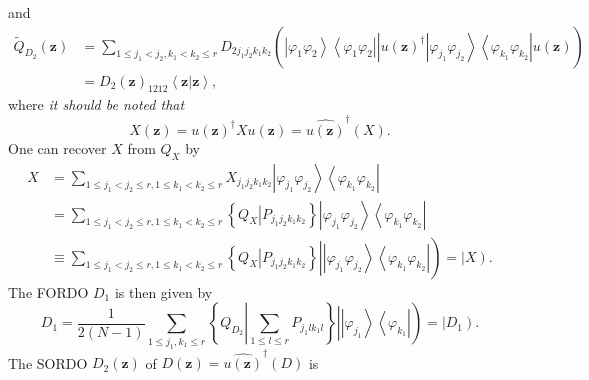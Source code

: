 \documentclass[aps,preprint]{revtex4}%
\begin{document}
and
\begin{align}
\tilde{Q}_{D_{2}}\left(  \mathbf{z}\right)   &  =\sum_{1\leq j_{1}<j_{2}%
,k_{1}<k_{2}\leq r}D_{2j_{1}j_{2}k_{1}k_{2}}\left(  \left.
\overset{}{\left\vert \varphi_{1}\varphi_{2}\right\rangle \left\langle
\varphi_{1}\varphi_{2}\right\vert }\right\vert \overset{}{u\left(
\mathbf{z}\right)  ^{\dagger}\left\vert \varphi_{j_{1}}\varphi_{j_{2}%
}\right\rangle \left\langle \varphi_{k_{1}}\varphi_{k_{2}}\right\vert u\left(
\mathbf{z}\right)  }\right)  \nonumber\\
&  =D_{2}\left(  \mathbf{z}\right)  _{1212}\left\langle \mathbf{z}\left\vert
\mathbf{z}\right.  \right\rangle ,
\end{align}
where \emph{it should be noted that }
\begin{equation}
X\left(  \mathbf{z}\right)  =u\left(  \mathbf{z}\right)  ^{\dagger}Xu\left(
\mathbf{z}\right)  =\widehat{u\left(  \mathbf{z}\right)  }^{\dagger}\left(
X\right)  .
\end{equation}
One can recover $X$ from $Q_{X}$ by
\begin{align}
X &  =\sum_{1\leq j_{1}<j_{2}\leq r,1\leq k_{1}<k_{2}\leq r}X{}_{j_{1}%
j_{2}k_{1}k_{2}}\left\vert \varphi_{j_{1}}\varphi_{j_{2}}\right\rangle
\left\langle \varphi_{k_{1}}\varphi_{k_{2}}\right\vert \nonumber\\
&  =\sum_{1\leq j_{1}<j_{2}\leq r,1\leq k_{1}<k_{2}\leq r}\left\{  \left.
Q_{X}\right\vert P_{j_{1}j_{2}k_{1}k_{2}}\right\}  \left\vert \varphi_{j_{1}%
}\varphi_{j_{2}}\right\rangle \left\langle \varphi_{k_{1}}\varphi_{k_{2}%
}\right\vert \nonumber\\
&  \equiv\sum_{1\leq j_{1}<j_{2}\leq r,1\leq k_{1}<k_{2}\leq r}\left\{
\left.  \overset{}{Q_{X}}\right\vert \overset{}{P_{j_{1}j_{2}k_{1}k_{2}}%
}\right\}  \left\vert \overset{}{\left\vert \varphi_{j_{1}}\varphi_{j_{2}%
}\right\rangle \left\langle \varphi_{k_{1}}\varphi_{k_{2}}\right\vert
}\right)  =\left\vert X\right)  .
\end{align}
The FORDO $D_{1}$ is then given by
\begin{equation}
D_{1}=\frac{1}{2\left(  N-1\right)  }\sum_{1\leq j_{1},k_{1}\leq r}\left\{
Q_{D_{2}}\left\vert \sum_{1\leq l\leq r}P_{j_{1}lk_{1}l}\right.  \right\}
\left\vert \overset{}{\left\vert \varphi_{j_{1}}\right\rangle \left\langle
\varphi_{k_{1}}\right\vert }\right)  =\left\vert D_{1}\right)  .
\end{equation}
The SORDO $D_{2}\left(  \mathbf{z}\right)  $ of $D\left(  \mathbf{z}\right)
=\widehat{u\left(  \mathbf{z}\right)  }^{\dagger}\left(  D\right)  $ is
\end{document}
